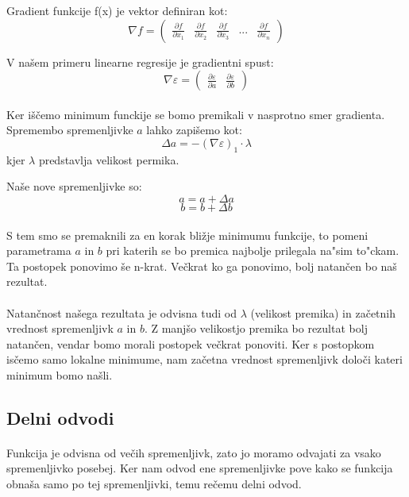 \documentclass[a4paper, 12pt]{article}
\begin{document}
	Gradient funkcije f(x) je vektor definiran kot:
	$$\nabla f = \begin{pmatrix}\frac{\partial f}{\partial x_{1}} & \frac{\partial f}{\partial x_{2}} & \frac{\partial f}{\partial x_{3}} & ... & \frac{\partial f}{\partial x_{n}}\end{pmatrix}$$

	V našem primeru linearne regresije je gradientni spust:
	$$\nabla \varepsilon =
	\begin{pmatrix}
	\frac{\partial \varepsilon}{\partial a} &
	\frac{\partial \varepsilon}{\partial b}
	\end{pmatrix}$$

	\paragraph{}
	Ker iščemo minimum funckije se bomo premikali v nasprotno smer gradienta. Spremembo spremenljivke $a$ lahko zapišemo kot:
	$$\Delta a = -(\nabla \varepsilon)_1 \cdot \lambda$$
	kjer $\lambda$ predstavlja velikost permika.

	Naše nove spremenljivke so:
	$$ a = a + \Delta a$$
	$$ b = b + \Delta b$$

	\paragraph{}
	S tem smo se premaknili za en korak bližje minimumu funkcije, to pomeni parametrama $a$ in $b$ pri katerih se bo premica najbolje prilegala na"sim to"ckam. Ta postopek ponovimo še n-krat. Večkrat ko ga ponovimo, bolj natančen bo naš rezultat.

	\paragraph{}
	Natančnost našega rezultata je odvisna tudi od $\lambda$ (velikost premika) in začetnih vrednost spremenljivk $a$ in $b$. Z manjšo velikostjo premika bo rezultat bolj natančen, vendar bomo morali postopek večkrat ponoviti. Ker s postopkom isčemo samo lokalne minimume, nam začetna vrednost spremenljivk določi kateri minimum bomo našli.

	\subsection*{Delni odvodi}
	\paragraph{}
	Funkcija je odvisna od večih spremenljivk, zato jo moramo odvajati za vsako spremenljivko posebej. Ker nam odvod ene spremenljivke pove kako se funkcija obnaša samo po tej spremenljivki, temu rečemu delni odvod.
\end{document}
